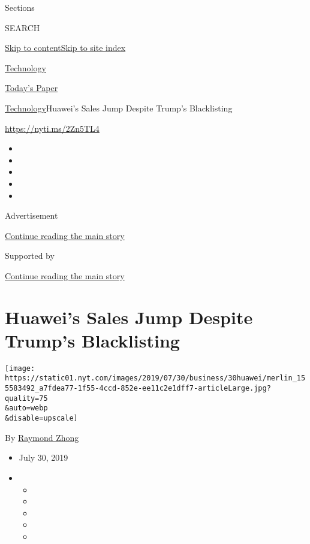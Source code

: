 Sections

SEARCH

\protect\hyperlink{site-content}{Skip to
content}\protect\hyperlink{site-index}{Skip to site index}

\href{https://www.nytimes.com/section/technology}{Technology}

\href{https://myaccount.nytimes.com/auth/login?response_type=cookie\&client_id=vi}{}

\href{https://www.nytimes.com/section/todayspaper}{Today's Paper}

\href{/section/technology}{Technology}\textbar{}Huawei's Sales Jump
Despite Trump's Blacklisting

\url{https://nyti.ms/2Zn5TL4}

\begin{itemize}
\item
\item
\item
\item
\item
\end{itemize}

Advertisement

\protect\hyperlink{after-top}{Continue reading the main story}

Supported by

\protect\hyperlink{after-sponsor}{Continue reading the main story}

\hypertarget{huaweis-sales-jump-despite-trumps-blacklisting}{%
\section{Huawei's Sales Jump Despite Trump's
Blacklisting}\label{huaweis-sales-jump-despite-trumps-blacklisting}}

\texttt{[image: https://static01.nyt.com/images/2019/07/30/business/30huawei/merlin\_155583492\_a7fdea77-1f55-4ccd-852e-ee11c2e1dff7-articleLarge.jpg?quality=75\\\&auto=webp\\\&disable=upscale]}

By \href{https://www.nytimes.com/by/raymond-zhong}{Raymond Zhong}

\begin{itemize}
\item
  July 30, 2019
\item
  \begin{itemize}
  \item
  \item
  \item
  \item
  \item
  \end{itemize}
\end{itemize}

